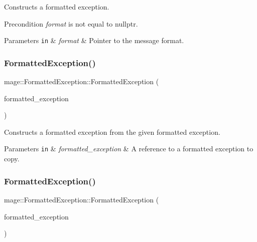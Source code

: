 Constructs a formatted exception.

\begin{DoxyPrecond}{Precondition}
{\itshape format} is not equal to {\ttfamily nullptr}. 
\end{DoxyPrecond}

\begin{DoxyParams}[1]{Parameters}
\mbox{\tt in}  & {\em format} & Pointer to the message format. \\
\hline
\end{DoxyParams}
\hypertarget{structmage_1_1_formatted_exception_ac42aa4b8dcd15a4f88fc578fec5b11db}{}\label{structmage_1_1_formatted_exception_ac42aa4b8dcd15a4f88fc578fec5b11db} 
\subsubsection{\texorpdfstring{Formatted\+Exception()}{FormattedException()}\hspace{0.1cm}{\footnotesize\ttfamily [3/4]}}
{\footnotesize\ttfamily mage\+::\+Formatted\+Exception\+::\+Formatted\+Exception (\begin{DoxyParamCaption}\item[{const \hyperlink{structmage_1_1_formatted_exception}{Formatted\+Exception} \&}]{formatted\+\_\+exception }\end{DoxyParamCaption})\hspace{0.3cm}{\ttfamily [default]}}

Constructs a formatted exception from the given formatted exception.


\begin{DoxyParams}[1]{Parameters}
\mbox{\tt in}  & {\em formatted\+\_\+exception} & A reference to a formatted exception to copy. \\
\hline
\end{DoxyParams}
\hypertarget{structmage_1_1_formatted_exception_ac47ff28101bb2660f40211d47afd6bf9}{}\label{structmage_1_1_formatted_exception_ac47ff28101bb2660f40211d47afd6bf9} 
\subsubsection{\texorpdfstring{Formatted\+Exception()}{FormattedException()}\hspace{0.1cm}{\footnotesize\ttfamily [4/4]}}
{\footnotesize\ttfamily mage\+::\+Formatted\+Exception\+::\+Formatted\+Exception (\begin{DoxyParamCaption}\item[{\hyperlink{structmage_1_1_formatted_exception}{Formatted\+Exception} \&\&}]{formatted\+\_\+exception }\end{DoxyParamCaption})\hspace{0.3cm}{\ttfamily [default]}}

